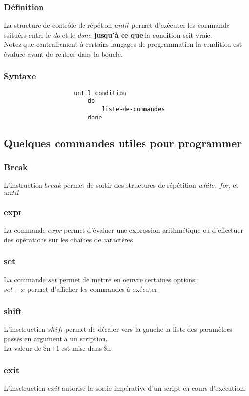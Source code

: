 			\subsubsection{Définition}
				La structure de contrôle de répétion $until$ permet d'exécuter les commande ssituées entre le $do$ et le $done$ \textbf{jusqu'à ce que} la condition soit vraie.\\
				Notez que contrairement à certains langages de programmation la condition est évaluée avant de rentrer dans la boucle.
			\subsubsection{Syntaxe}
				\begin{verbatim}
					until condition
					    do
					        liste-de-commandes
					    done
				\end{verbatim}
		\subsection{Quelques commandes utiles pour programmer}
			\subsubsection{Break}
				L'instruction $break$ permet de sortir des structures de répétition $while$, $for$, et $until$
			\subsubsection{expr}
				La commande $expr$ permet d'évaluer une expression arithmétique ou d'effectuer des opérations sur les chaînes de caractères
			\subsubsection{set}
				La commande $set$ permet de mettre en oeuvre certaines options:\\
				$set -x$ permet d'afficher les commandes à exécuter
			\subsubsection{shift}
				L'insctruction $shift$ permet de décaler vers la gauche la liste des paramètres passés en argument à un scription.\\
				La valeur de \$n+1 est mise dans \$n
			\subsubsection{exit}
				L'insctruction $exit$ autorise la sortie impérative d'un script en cours d'exécution.
				

